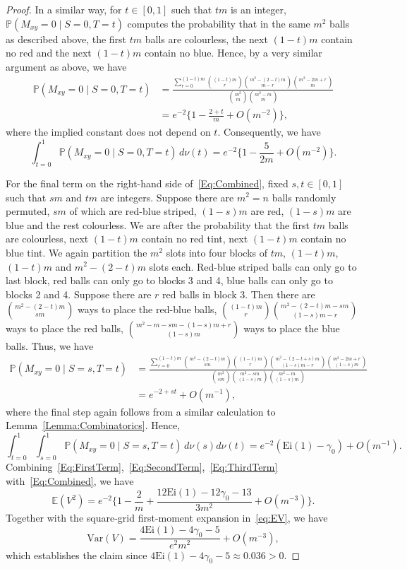 \documentclass[11pt]{article}
\begin{document}
\begin{proof}
In a similar way, for $t\in[0,1]$ such that $tm$ is an integer, $\mathbb{P}(M_{xy}=0\mid S=0, T=t)$ computes the probability that in the same $m^2$ balls as described above, the first $tm$ balls are colourless, the next $(1-t)m$ contain no red and the next $(1-t)m$ contain no blue. Hence, by a very similar argument as above, we have
\begin{align*}
\mathbb{P}(M_{xy} = 0 \mid S=0, T=t) &=\frac{\sum_{r=0}^{(1-t)m}\binom{(1-t)m}{r}\binom{m^2-(2-t)m}{m-r}\binom{m^2-2m+r}{m}}{\binom{m^2}{m}\binom{m^2-m}{m}} \\
&=e^{-2}\biggl\{1-\frac{2+t}{m}+O(m^{-2})\biggr\},
\end{align*}
where the implied constant does not depend on $t$. Consequently, we have 
\begin{equation}
  \int_{t=0}^1\mathbb{P}(M_{xy}=0 \mid S=0, T=t)\,d\nu(t) = e^{-2}\biggl\{1-\frac{5}{2m}+O(m^{-2})\biggr\}.\label{Eq:SecondTerm}
\end{equation}

For the final term on the right-hand side of~\eqref{Eq:Combined}, fixed $s,t\in[0,1]$ such that $sm$ and $tm$ are integers. Suppose there are $m^2=n$ balls randomly permuted, $sm$ of which are red-blue striped, $(1-s)m$ are red, $(1-s)m$ are blue and the rest colourless. We are after the probability that the first $tm$ balls are colourless, next $(1-t)m$ contain no red tint, next $(1-t)m$ contain no blue tint. We again partition the $m^2$ slots into four blocks of $tm$, $(1-t)m$, $(1-t)m$ and $m^2-(2-t)m$ slots each. Red-blue striped balls can only go to last block, red balls can only go to blocks 3 and 4, blue balls can only go to blocks 2 and 4. Suppose there are $r$ red balls in block 3. Then there are $\binom{m^2-(2-t)m}{sm}$ ways to place the red-blue balls, $\binom{(1-t)m}{r}\binom{m^2-(2-t)m-sm}{(1-s)m-r}$ ways to place the red balls, $\binom{m^2-m-sm-(1-s)m+r}{(1-s)m}$ ways to place the blue balls. Thus, we have
\begin{align*}
  \mathbb{P}(M_{xy} = 0 \mid S=s,T=t) &= \frac{\sum_{r=0}^{(1-t)m} \binom{m^2-(2-t)m}{sm}\binom{(1-t)m}{r}\binom{m^2-(2-t+s)m}{(1-s)m-r}\binom{m^2-2m+r}{(1-s)m}}{\binom{m^2}{sm}\binom{m^2-sm}{(1-s)m}\binom{m^2-m}{(1-s)m}}\\
  &=e^{-2+st}+O(m^{-1}),
\end{align*}
where the final step again follows from a similar calculation to Lemma~\ref{Lemma:Combinatorics}. Hence,
\begin{equation}
  \int_{t=0}^1\int_{s=0}^1 \mathbb{P}(M_{xy} = 0 \mid S=s,T=t)\,d\nu(s)d\nu(t) = e^{-2}(\mathrm{Ei}(1)-\gamma_0) + O(m^{-1}).\label{Eq:ThirdTerm}
\end{equation} 
Combining~\eqref{Eq:FirstTerm},~\eqref{Eq:SecondTerm},~\eqref{Eq:ThirdTerm} with~\eqref{Eq:Combined}, we have
\[
  \mathbb{E}(V^2) = e^{-2}\biggl\{1-\frac{2}{m}+\frac{12\mathrm{Ei}(1)-12\gamma_0 -13}{3m^2}+O(m^{-3})\biggr\}.
\]
Together with the square-grid first-moment expansion in~\eqref{eq:EV}, we have
\[
  \mathrm{Var}(V) = \frac{4\mathrm{Ei}(1)-4\gamma_0-5}{e^2 m^2}+O(m^{-3}),
\]
which establishes the claim since $4\mathrm{Ei}(1)-4\gamma_0-5 \approx 0.036 > 0$.
\end{proof}
\end{document}
